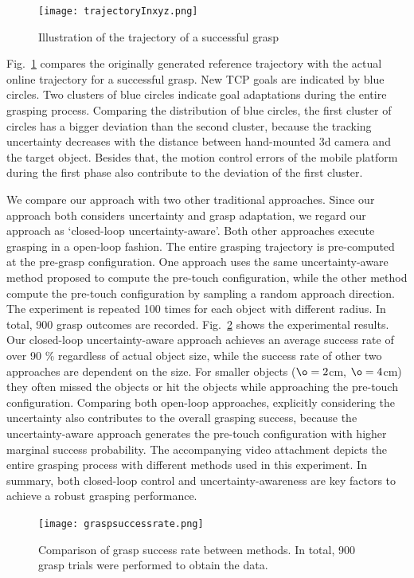 \begin{figure}[!htbp]
\centering
\texttt{[image: trajectoryInxyz.png]}
\captionsetup{justification=raggedright}
\caption{Illustration of the trajectory of a successful grasp}
\label{fig:demo_trajectory}       %
\end{figure}  
Fig.~\ref{fig:demo_trajectory} compares the originally generated reference trajectory with the actual online trajectory for a successful grasp. New TCP goals are indicated by blue circles. Two clusters of blue circles indicate goal adaptations during the entire grasping process. Comparing the distribution of blue circles, the first cluster of circles has a bigger deviation than the second cluster, because the tracking uncertainty decreases with the distance between hand-mounted 3d camera and the target object. Besides that, the motion control errors of the mobile platform during the first phase also contribute to the deviation of the first cluster. 

We compare our approach with two other traditional approaches. Since our approach both considers uncertainty and grasp adaptation, we regard our approach as `closed-loop uncertainty-aware'. Both other approaches execute grasping in a open-loop fashion. The entire grasping trajectory is pre-computed at the pre-grasp configuration. One approach uses the same uncertainty-aware method proposed to compute the pre-touch configuration, while the other method compute the pre-touch configuration by sampling a random approach direction. The experiment is repeated 100 times for each object with different radius. In total, 900 grasp outcomes are recorded. Fig.~\ref{fig:exp_result} shows the experimental results. Our closed-loop uncertainty-aware approach achieves an average success rate of over 90 $\%$ regardless of actual object size, while the success rate of other two approaches are dependent on the size. For smaller objects ($\o=2$cm, $\o=4$cm) they often missed the objects or hit the objects while approaching the pre-touch configuration. Comparing both open-loop approaches, explicitly considering the uncertainty also contributes to the overall grasping success, because the uncertainty-aware approach generates the pre-touch configuration with higher marginal success probability. The accompanying video attachment depicts the entire grasping process with different methods used in this experiment. In summary, both closed-loop control and uncertainty-awareness are key factors to achieve a robust grasping performance. 

\begin{figure}[!htbp]
\centering
\texttt{[image: graspsuccessrate.png]}
\captionsetup{justification=raggedright}
\caption{Comparison of grasp success rate between methods. In total, 900
grasp trials were performed to obtain the data.}
\label{fig:exp_result}       %
\end{figure} 


